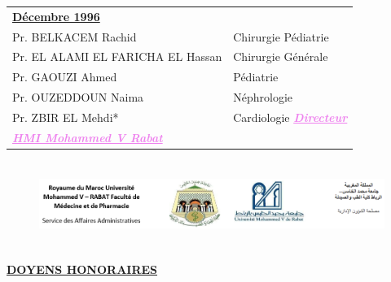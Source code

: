 \noindent
\begin{tcolorbox}[colback=white, colframe=white]
\begin{tabular}{l l}
 \multicolumn{2}{l}{\textbf{\underline{Décembre 1996}}}\vspace*{0.5em}\\
 Pr. BELKACEM Rachid & \hspace*{2em} Chirurgie	Pédiatrie \\
 Pr. EL ALAMI EL FARICHA EL Hassan & \hspace*{2em} Chirurgie Générale  \\
 Pr. GAOUZI Ahmed & \hspace*{2em} Pédiatrie \\
 Pr. OUZEDDOUN Naima	& \hspace*{2em} Néphrologie\\
 Pr. ZBIR EL Mehdi* &	\hspace*{2em} Cardiologie \textcolor{violet}{\textbf{\emph{\underline{Directeur}}}} \\
  \textcolor{violet}{\textbf{\emph{\underline{HMI Mohammed V Rabat}}}} & \\

\end{tabular}
\end{tcolorbox}

\fi

\setcounter{page}{2} %
\renewcommand*{\arraystretch}{1.5}

\begin{figure}[H]
  \includegraphics*[width=06in, height= 1.1in]{Images/school_icon.png}
\end{figure}
\textbf{\underline{DOYENS HONORAIRES}}

\vspace*{1em}

